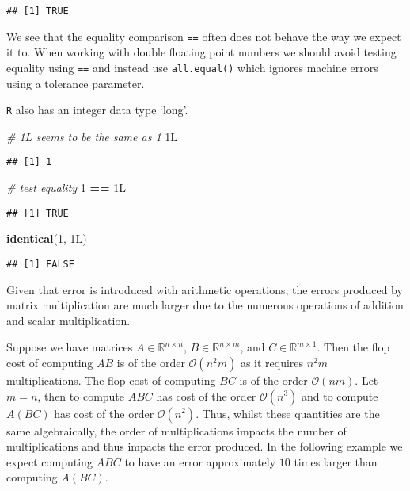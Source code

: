 \documentclass[]{article}
\newenvironment{Shaded}{\begin{snugshade}}{\end{snugshade}}
\newcommand{\CommentTok}[1]{\textcolor[rgb]{0.56,0.35,0.01}{\textit{#1}}}
\newcommand{\DecValTok}[1]{\textcolor[rgb]{0.00,0.00,0.81}{#1}}
\newcommand{\KeywordTok}[1]{\textcolor[rgb]{0.13,0.29,0.53}{\textbf{#1}}}
\newcommand{\NormalTok}[1]{#1}
\newcommand{\OperatorTok}[1]{\textcolor[rgb]{0.81,0.36,0.00}{\textbf{#1}}}
\newcommand{\StringTok}[1]{\textcolor[rgb]{0.31,0.60,0.02}{#1}}
\begin{document}
\begin{verbatim}
## [1] TRUE
\end{verbatim}

We see that the equality comparison \texttt{==} often does not behave
the way we expect it to. When working with double floating point numbers
we should avoid testing equality using \texttt{==} and instead use
\texttt{all.equal()} which ignores machine errors using a tolerance
parameter.

\texttt{R} also has an integer data type `long'.

\begin{Shaded}
\begin{Highlighting}[]
\CommentTok{# 1L seems to be the same as 1}
\NormalTok{1L}
\end{Highlighting}
\end{Shaded}

\begin{verbatim}
## [1] 1
\end{verbatim}

\begin{Shaded}
\begin{Highlighting}[]
\CommentTok{# test equality}
\DecValTok{1} \OperatorTok{==}\StringTok{ }\NormalTok{1L}
\end{Highlighting}
\end{Shaded}

\begin{verbatim}
## [1] TRUE
\end{verbatim}

\begin{Shaded}
\begin{Highlighting}[]
\KeywordTok{identical}\NormalTok{(}\DecValTok{1}\NormalTok{, 1L)}
\end{Highlighting}
\end{Shaded}

\begin{verbatim}
## [1] FALSE
\end{verbatim}

Given that error is introduced with arithmetic operations, the errors
produced by matrix multiplication are much larger due to the numerous
operations of addition and scalar multiplication.

Suppose we have matrices \(A \in \mathbb{R}^{n \times n}\),
\(B \in \mathbb{R}^{n \times m}\), and
\(C \in \mathbb{R}^{m \times 1}\). Then the flop cost of computing
\(AB\) is of the order \(\mathcal{O}(n^2m)\) as it requires \(n^2m\)
multiplications. The flop cost of computing \(BC\) is of the order
\(\mathcal{O}(nm)\). Let \(m=n\), then to compute \(ABC\) has cost of
the order \(\mathcal{O}(n^3)\) and to compute \(A(BC)\) has cost of the
order \(\mathcal{O}(n^2)\). Thus, whilst these quantities are the same
algebraically, the order of multiplications impacts the number of
multiplications and thus impacts the error produced. In the following
example we expect computing \(ABC\) to have an error approximately
\(10\) times larger than computing \(A(BC)\).
\end{document}
